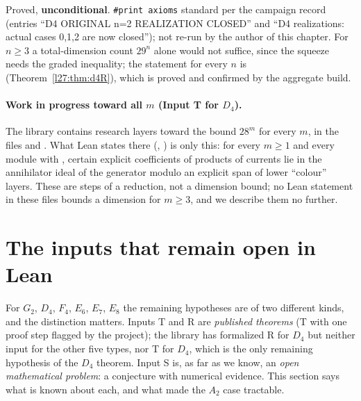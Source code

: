 \begin{status}
Proved, \textbf{unconditional}. \texttt{\#print axioms} standard per the campaign record (entries ``D4 ORIGINAL n=2
REALIZATION CLOSED'' and ``D4 realizations: actual cases 0,1,2 are now closed''); not re-run by the author of this chapter. For
$n\ge3$ a total-dimension count $29^n$ alone would not suffice, since the squeeze needs the graded inequality; the statement for
every $n$ is  (Theorem~\ref{l27:thm:d4R}), which is proved and confirmed by the aggregate build.
\end{status}

\paragraph{Work in progress toward all $m$ (Input T for $D_4$).} The library contains research layers toward the bound $28^m$ for every
$m$, in the files  and
. What Lean states there
(, ) is only this: for every $m\ge1$ and every module with
, certain explicit coefficients of products of currents lie in the annihilator ideal of the generator
modulo an explicit span of lower ``colour'' layers. These are steps of a reduction, not a dimension bound; no Lean statement in these
files bounds a dimension for $m\ge3$, and we describe them no further.

\section{The inputs that remain open in Lean}\label{l27:sec:cores}

For $G_2$, $D_4$, $F_4$, $E_6$, $E_7$, $E_8$ the remaining hypotheses are of two different kinds, and the distinction matters. Inputs T
and R are \emph{published theorems} (T with one proof step flagged by the project); the library has formalized R for $D_4$ but
neither input for the other five types, nor T for $D_4$, which is the only remaining hypothesis of the $D_4$ theorem. Input S is,
as far as we know, an \emph{open mathematical problem}: a conjecture with numerical evidence. This section says what is known about
each, and what made the $A_2$ case tractable.

